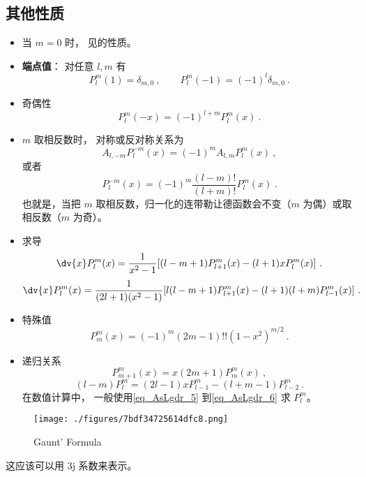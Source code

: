 \subsection{其他性质}
\begin{itemize}
\item 当 $m = 0$ 时， 见的性质。

\item \textbf{端点值}： 对任意 $l, m$ 有
\begin{equation}\label{eq_AsLgdr_2}
P_l^m(1) = \delta_{m, 0}~,
\qquad
P_l^m(-1) = (-1)^l \delta_{m, 0}~.
\end{equation}
\item 奇偶性
\begin{equation}
P_l^m(-x) = (-1)^{l+m}P_l^m(x)~.
\end{equation}
\item $m$ 取相反数时， 对称或反对称关系为
\begin{equation}
A_{l,-m} P_l^{-m}(x) = (-1)^m A_{l,m} P_l^m(x)~,
\end{equation}
或者
\begin{equation}
P_l^{-m}(x) = (-1)^m \frac{(l-m)!}{(l+m)!} P_l^m(x)~.
\end{equation}
也就是，当把 $m$ 取相反数，归一化的连带勒让德函数会不变（$m$ 为偶）或取相反数（$m$ 为奇）。
\item 求导
\begin{equation}\label{eq_AsLgdr_7} %
\dv{x} P_l^m(x) = \frac{1}{x^2-1} [(l-m+1)P_{l+1}^m(x) - (l+1)xP_l^m(x)]~.
\end{equation}
\begin{equation}\label{eq_AsLgdr_8} %
\dv{x} P_l^m(x) = \frac{1}{(2l+1)(x^2-1)} [l(l-m+1)P_{l+1}^m(x) - (l+1)(l+m)P_{l-1}^m(x)]~.
\end{equation}
\item 特殊值
\begin{equation}\label{eq_AsLgdr_5} %
P_m^m(x) = (-1)^m (2m-1)!! (1-x^2)^{m/2}~.
\end{equation}
\item 递归关系
\begin{equation} %
P_{m+1}^m(x) = x (2m + 1) P_m^m(x)~,
\end{equation}
\begin{equation}\label{eq_AsLgdr_6} %
(l-m) P_l^m = (2l-1) x P_{l-1}^m - (l+m-1) P_{l-2}^m~.
\end{equation}
在数值计算中， 一般使用\autoref{eq_AsLgdr_5} 到\autoref{eq_AsLgdr_6} 求 $P_l^m$。
\end{itemize}


\begin{figure}[ht]
\centering
\texttt{[image: ./figures/7bdf34725614dfc8.png]}
\caption{Gaunt' Formula} \label{fig_AsLgdr_1}
\end{figure}
这应该可以用 3j 系数来表示。
